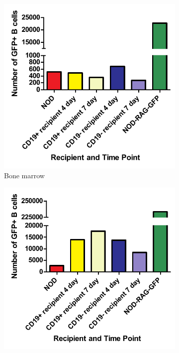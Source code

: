 \begin{figure}
\begin{subfigure}{0.45\textwidth}
	\includegraphics[width=\textwidth]{Figures/BMGFPBcells.pdf}
	\caption{Bone marrow}
	\label{subfig:BMGFPBcells}
	\end{subfigure}
	\begin{subfigure}{0.45\textwidth}
	\includegraphics[width=\textwidth]{Figures/SpleenGFPBcells.pdf}

\end{subfigure}
\end{figure}
